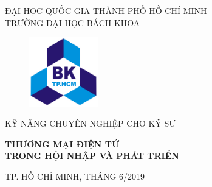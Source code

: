 \documentclass[13pt,a4paper]{article}
\begin{document}
\begin{titlepage}
\begin{center}
ĐẠI HỌC QUỐC GIA THÀNH PHỐ HỒ CHÍ MINH \\
TRƯỜNG ĐẠI HỌC BÁCH KHOA \\
\end{center}

\vspace{1cm}

\begin{figure}[h!]
\begin{center}
\includegraphics[width=3cm]{images/hcmut.png}
\end{center}
\end{figure}

\vspace{1cm}


\large{KỸ NĂNG CHUYÊN NGHIỆP CHO KỸ SƯ}
\hline
\begin{center}
\textbf{{\huge THƯƠNG MẠI ĐIỆN TỬ}} \\
\textbf{{\huge TRONG HỘI NHẬP VÀ PHÁT TRIỂN}}
\end{center}
\hline

\begin{center}
{\footnotesize TP. HỒ CHÍ MINH, THÁNG 6/2019}
\end{center}
\end{titlepage}
\newpage
\tableofcontents
\newpage
\fontsize{13pt}{1.2pt}\selectfont %
\end{document}
